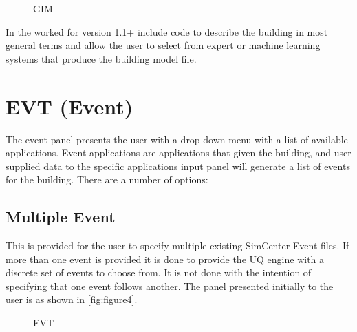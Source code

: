 \begin{enumerate}
\begin{figure}[!htbp]
  \caption{GIM}
  \label{fig:figure3}
\end{figure}

In the worked for version 1.1+ include code to describe the building in most general terms and allow 
the user to select from expert or machine learning systems that produce the building model file.

\end{enumerate}


\section{EVT (Event)}
The event panel presents the user with a drop-down menu with a list of available applications. 
Event applications are applications that given the building, 
and user supplied data to the specific applications input panel will generate a list of events for the building. 
There are a number of options:

\subsection{Multiple Event}

This is provided for the user to specify multiple existing SimCenter Event files. 
If more than one event is provided it is done to provide the UQ engine with a discrete set of events to choose from. 
It is not done with the intention of specifying that one event follows another. 
The panel presented initially to the user is as shown in \autoref{fig:figure4}.

\begin{figure}[!htbp]
  \caption{EVT}
  \label{fig:figure4}
\end{figure}

